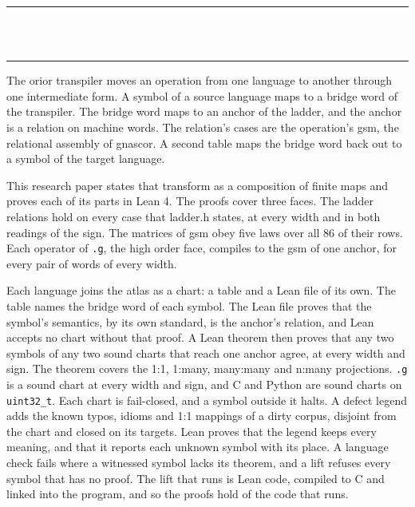 \thispagestyle{empty}
\begin{center}
  \rule{\textwidth}{0.4pt}\\[0.9em]
  {\Large{}}\\[0.7em]
  \rule{\textwidth}{0.4pt}
\end{center}
\bigskip

\noindent The orior transpiler moves an operation from one language to another through one intermediate
form. A symbol of a source language maps to a bridge word of the transpiler. The bridge word maps to an anchor
of the ladder, and the anchor is a relation on machine words. The relation's cases are the operation's gsm, the
relational assembly of gnascor. A second table maps the bridge word back out to a symbol of the target language.

This research paper states that transform as a composition of finite maps and proves each of its parts in Lean
4. The proofs cover three faces. The ladder relations hold on every case that ladder.h states, at every width and
in both readings of the sign. The matrices of gsm obey five laws over all 86 of their rows. Each operator of
\texttt{.g}, the high order face, compiles to the gsm of one anchor, for every pair of words of every width.

Each language joins the atlas as a chart: a table and a Lean file of its own. The table names the bridge word of
each symbol. The Lean file proves that the symbol's semantics, by its own standard, is the anchor's relation, and
Lean accepts no chart without that proof. A Lean theorem then proves that any two symbols of any two sound charts
that reach one anchor agree, at every width and sign. The theorem covers the 1:1, 1:many, many:many and n:many
projections. \texttt{.g} is a sound chart at every width and sign, and C and Python are sound charts on
\texttt{uint32\_t}. Each chart is fail-closed, and a symbol outside it halts. A defect legend adds the known
typos, idioms and 1:1 mappings of a dirty corpus, disjoint from the chart and closed on its targets. Lean proves
that the legend keeps every meaning, and that it reports each unknown symbol with its place. A language check
fails where a witnessed symbol lacks its theorem, and a lift refuses every symbol that has no proof. The lift that
runs is Lean code, compiled to C and linked into the program, and so the proofs hold of the code that runs.
